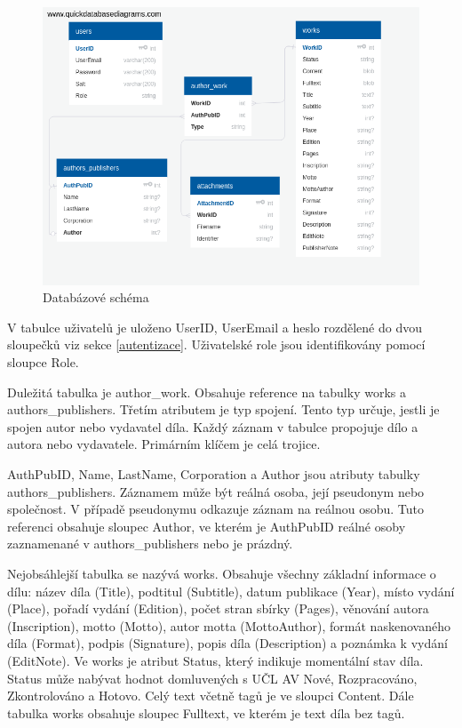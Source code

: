         \begin {figure}[H]\centering
            \includegraphics[width=\textwidth]{images/schema}
            \caption {Databázové schéma}
            \label {fig:schema}
        \end{figure}
        
        V tabulce uživatelů je uloženo UserID, UserEmail a heslo rozdělené do dvou sloupečků viz sekce \ref{autentizace}. Uživatelské role jsou identifikovány pomocí sloupce Role.
        
        Duležitá tabulka je author\_work. Obsahuje reference na tabulky works a authors\_publishers. Třetím atributem je typ spojení. Tento typ určuje, jestli je spojen autor nebo vydavatel díla. Každý záznam v tabulce propojuje dílo a autora nebo vydavatele. Primárním klíčem je celá trojice.
        
        AuthPubID, Name, LastName, Corporation a Author jsou atributy tabulky authors\_publishers. Záznamem může být reálná osoba, její pseudonym nebo společnost. V případě pseudonymu odkazuje záznam na reálnou osobu. Tuto referenci obsahuje sloupec Author, ve kterém je AuthPubID reálné osoby zaznamenané v authors\_publishers nebo je prázdný.
        
        Nejobsáhlejší tabulka se nazývá works. Obsahuje všechny základní informace o dílu: název díla (Title), podtitul (Subtitle), datum publikace (Year), místo vydání (Place), pořadí vydání (Edition), počet stran sbírky (Pages), věnování autora (Inscription), motto (Motto), autor motta (MottoAuthor), formát naskenovaného díla (Format), podpis (Signature), popis díla (Description) a poznámka k vydání (EditNote). Ve works je atribut Status, který indikuje momentální stav díla. Status může nabývat hodnot domluvených s UČL AV Nové, Rozpracováno, Zkontrolováno a Hotovo. Celý text včetně tagů je ve sloupci Content. Dále tabulka works obsahuje sloupec Fulltext, ve kterém je text díla bez tagů.
        
